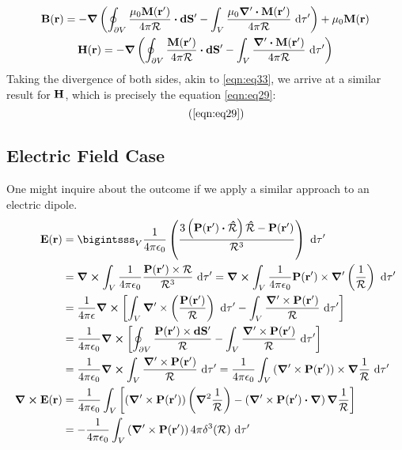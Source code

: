 \documentclass{article}
\numberwithin{equation}{section}
\newcommand\recallLabel[1]
   {\csname labeled:#1\endcsname\tag{\ref{#1}}}
\begin{document}
\begin{gather}
\vb{B}(\vb{r})=-\grad\left(\oint_{\partial V} \frac{\mu_0 \vb{M}(\vb{r'})}{4\pi\mathcal{R}} \vdot\vb{dS'}-\int_V \frac{\mu_0\grad'\vdot\vb{M}(\vb{r'})}{4\pi\mathcal{R}}\ \dd\tau' \right)+\mu_0\vb{M}(\vb{r})\nonumber\\\vb{H}(\vb{r})=-\grad\left(\oint_{\partial V} \frac{\vb{M}(\vb{r'})}{4\pi\mathcal{R}} \vdot\vb{dS'}-\int_V \frac{\grad'\vdot\vb{M}(\vb{r'})}{4\pi\mathcal{R}}\ \dd\tau' \right)\label{eqn:eq38}
\end{gather}
Taking the divergence of both sides, akin to \eqref{eqn:eq33}, we arrive at a similar result for $\vb{H}$, which is precisely the equation \eqref{eqn:eq29}:
\begin{equation*}
\recallLabel{eqn:eq29}
\end{equation*}
\subsection{Electric Field Case}
One might inquire about the outcome if we apply a similar approach to an electric dipole.
\begin{align}
\vb{E}(\vb{r}) &=\bigintsss_V \frac{1}{4\pi\epsilon_0}\left( \frac{3\left(\vb{P}(\vb{r'})\vdot\vu{\mathcal{R}}\right)\vu{\mathcal{R}}-\vb{P}(\vb{r'})}{\mathcal{R}^3}\right)\ \dd\tau'\nonumber\\ &=\curl\int_V \frac{1}{4\pi\epsilon_0}  \frac{\vb{P}(\vb{r'})\times\vb{\mathcal{R}}}{\mathcal{R}^3}\ \dd\tau'=\curl\int_V \frac{1}{4\pi\epsilon_0} \vb{P}(\vb{r'})\times\grad'\left( \frac{1}{\mathcal{R}}\right)\ \dd\tau' \nonumber\\&=\frac{1}{4\pi\epsilon} \curl\left[ \int_V \grad'\times\left(\frac{\vb{P}(\vb{r'})}{\mathcal{R}}\right)\ \dd\tau' - \int_V \frac{\grad'\times\vb{P}(\vb{r'})}{\mathcal{R}}\ \dd\tau' \right]\nonumber\\&=\frac{1}{4\pi\epsilon_0} \curl\left[ \oint_{\partial V}\frac{\vb{P}(\vb{r'})\times\vb{dS'}}{\mathcal{R}} - \int_V \frac{\grad'\times\vb{P}(\vb{r'})}{\mathcal{R}}\ \dd\tau' \right]\nonumber\\&=\frac{1}{4\pi\epsilon_0} \curl \int_V \frac{\grad'\times\vb{P}(\vb{r'})}{\mathcal{R}} \ \dd\tau'=\frac{1}{4\pi\epsilon_0} \int_V \left(\grad'\times\vb{P}(\vb{r'})\right)\times\grad\frac{1}{\mathcal{R}}\ \dd\tau'\nonumber\\\curl\vb{E}(\vb{r})&=\frac{1}{4\pi\epsilon_0}\int_V \left[\left(\grad'\times\vb{P}(\vb{r'})\right)\left( \grad^2 \frac{1}{\mathcal{R}}\right) - \left(\grad'\times\vb{P}(\vb{r'})\vdot \grad \right) \grad\frac{1}{\mathcal{R}}\right]\nonumber\\&=-\frac{1}{4\pi\epsilon_0} \int_V \left(\grad'\times\vb{P}(\vb{r'})\right) 4\pi\delta^3(\vb{\mathcal{R}})\ \dd\tau'\nonumber
\end{align}
\end{document}
